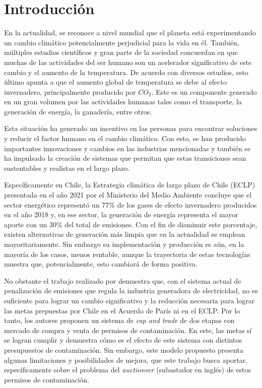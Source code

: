 
\chapter{Introducción}
\label{c1} %

En la actualidad, se reconoce a nivel mundial que el planeta está experimentando un cambio climático potencialmente perjudicial para la vida en él. También, múltiples estudios científicos y gran parte de la sociedad concuerdan en que muchas de las actividades del ser humano son un acelerador significativo de este cambio y el aumento de la temperatura. De acuerdo con diversos estudios, esto último apunta a que el aumento global de temperatura se debe al efecto invernadero, principalmente producido por $CO_2$. Este es un componente generado en un gran volumen por las actividades humanas tales como el transporte, la generación de energía, la ganadería, entre otros.
\vspace{2.5mm}

Esta situación ha generado un incentivo en las personas para encontrar soluciones y reducir el factor humano en el cambio climático. Con esto, se han producido importantes innovaciones y cambios en las industrias mencionadas y también se ha impulsado la creación de sistemas que permitan que estas transiciones sean sustentables y realistas en el largo plazo. 
\vspace{2.5mm}

Específicamente en Chile, la Estrategia climática de largo plazo de Chile (ECLP) presentada en el año 2021 por el Ministerio del Medio Ambiente concluye que el sector energético representó un 77\% de los gases de efecto invernadero producidos  en el año 2018 y, en ese sector, la generación de energía representa el mayor aporte con un 30\% del total de emisiones. Con el fin de disminuir este porcentaje, existen alternativas de generación más limpia que en la actualidad se emplean mayoritariamente. Sin embargo su implementación y producción es aún, en la mayoría de los casos, menos rentable, aunque la trayectoria de estas tecnologías muestra que, potencialmente, esto cambiará de forma positiva.
\vspace{2.5mm}

No obstante el trabajo realizado por  demuestra que, con el sistema actual de penalización de emisiones que regula la industria generadora de electricidad, no es suficiente para lograr un cambio significativo y la reducción necesaria para lograr las metas prepuestas por Chile en el Acuerdo de París ni en el ECLP. Por lo tanto, los autores proponen un sistema de \emph{cap and trade} de dos etapas con mercado de compra y venta de permisos de contaminación. En este, las metas sí se logran cumplir y demuestra cómo es el efecto de este sistema con distintos presupuestos de contaminación. Sin embargo, este modelo propuesto presenta algunas limitaciones y posibilidades de mejora, que este trabajo busca aportar, específicamente sobre el problema del \emph{auctioneer} (subastador en inglés) de estos permisos de contaminación.


